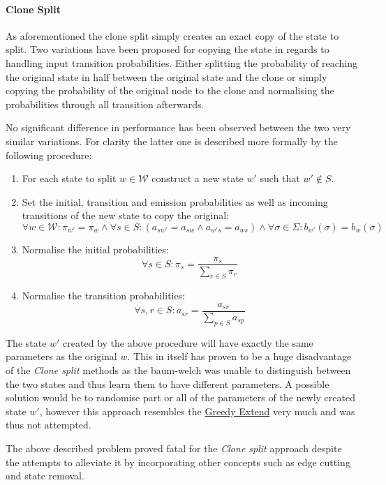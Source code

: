 \paragraph{Clone Split}
As aforementioned the clone split simply creates an exact copy of the state to split. Two variations have been proposed for copying the state in regards to handling input transition probabilities. Either splitting the probability of reaching the original state in half between the original state and the clone or simply copying the probability of the original node to the clone and normalising the probabilities through all transition afterwards.

No significant difference in performance has been observed between the two very similar variations. For clarity the latter one is described more formally by the following procedure:
\begin{enumerate}
	\item For each state to split $w \in\mathcal{W}$ construct a new state $w'$ such that $w'\notin S$.
	\item Set the initial, transition and emission probabilities as well as incoming transitions of the new state to copy the original:
	$$\forall w\in\mathcal{W}: \pi_{w'} = \pi_w \wedge \forall s\in S: (a_{sw'} = a_{sw} \wedge a_{w's} = a_{ws}) \wedge \forall \sigma\in\Sigma: b_{w'}(\sigma)=b_w(\sigma)$$
	\item Normalise the initial probabilities:
	$$\forall s\in S: \pi_s = \frac{\pi_s}{\sum_{r\in S}\pi_r}$$
	\item Normalise the transition probabilities:
	$$\forall s,r\in S: a_{sr} = \frac{a_{sr}}{\sum_{p\in S}a_{sp}}$$
\end{enumerate}

The state $w'$ created by the above procedure will have exactly the same parameters as the original $w$. This in itself has proven to be a huge disadvantage of the \emph{Clone split} methods as the \gls{baum-welch} was unable to distinguish between the two states and thus learn them to have different parameters. A possible solution would be to randomise part or all of the parameters of the newly created state $w'$, however this approach resembles the \hyperref[sec:greedy_extend]{Greedy Extend} very much and was thus not attempted.

The above described problem proved fatal for the \emph{Clone split} approach despite the attempts to alleviate it by incorporating other concepts such as edge cutting and state removal.

